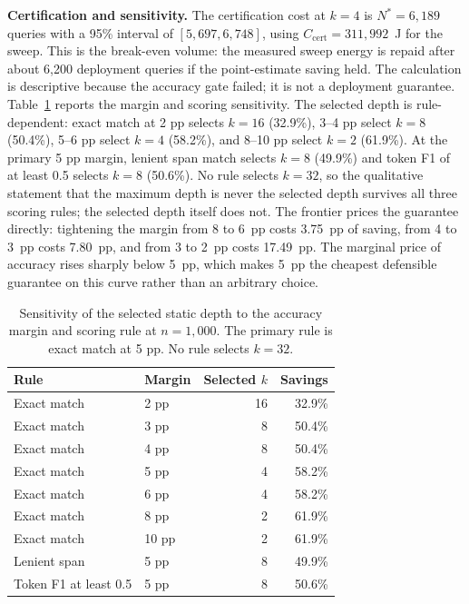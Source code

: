 \documentclass[a4paper,fleqn]{cas-sc}
\begin{document}
\textbf{Certification and sensitivity.} The certification cost at $k=4$ is $N^{*}=6{,}189$ queries with a 95\% interval of $[5{,}697,6{,}748]$, using $C_{\mathrm{cert}}=311{,}992$~J for the sweep. This is the break-even volume: the measured sweep energy is repaid after about 6{,}200 deployment queries if the point-estimate saving held. The calculation is descriptive because the accuracy gate failed; it is not a deployment guarantee. Table~\ref{tab:p1sens} reports the margin and scoring sensitivity. The selected depth is rule-dependent: exact match at 2 pp selects $k=16$ (32.9\%), 3--4 pp select $k=8$ (50.4\%), 5--6 pp select $k=4$ (58.2\%), and 8--10 pp select $k=2$ (61.9\%). At the primary 5 pp margin, lenient span match selects $k=8$ (49.9\%) and token F1 of at least 0.5 selects $k=8$ (50.6\%). No rule selects $k=32$, so the qualitative statement that the maximum depth is never the selected depth survives all three scoring rules; the selected depth itself does not. The frontier prices the guarantee directly: tightening the margin from 8 to 6~pp costs 3.75~pp of saving, from 4 to 3~pp costs 7.80~pp, and from 3 to 2~pp costs 17.49~pp. The marginal price of accuracy rises sharply below 5~pp, which makes 5~pp the cheapest defensible guarantee on this curve rather than an arbitrary choice.

\begin{table}[pos=htbp]
  \centering
  \caption{Sensitivity of the selected static depth to the accuracy margin and scoring rule at $n=1{,}000$. The primary rule is exact match at 5 pp. No rule selects $k=32$.}
  \label{tab:p1sens}
  \footnotesize
  \setlength{\tabcolsep}{6pt}
  \begin{tabular}{@{}llrr@{}}
    \toprule
    \textbf{Rule} & \textbf{Margin} & \textbf{Selected $k$} & \textbf{Savings} \\
    \midrule
    Exact match & 2 pp & 16 & 32.9\% \\
    Exact match & 3 pp & 8 & 50.4\% \\
    Exact match & 4 pp & 8 & 50.4\% \\
    Exact match & 5 pp & 4 & 58.2\% \\
    Exact match & 6 pp & 4 & 58.2\% \\
    Exact match & 8 pp & 2 & 61.9\% \\
    Exact match & 10 pp & 2 & 61.9\% \\
    \midrule
    Lenient span & 5 pp & 8 & 49.9\% \\
    Token F1 at least 0.5 & 5 pp & 8 & 50.6\% \\
    \bottomrule
  \end{tabular}
\end{table}
\end{document}
